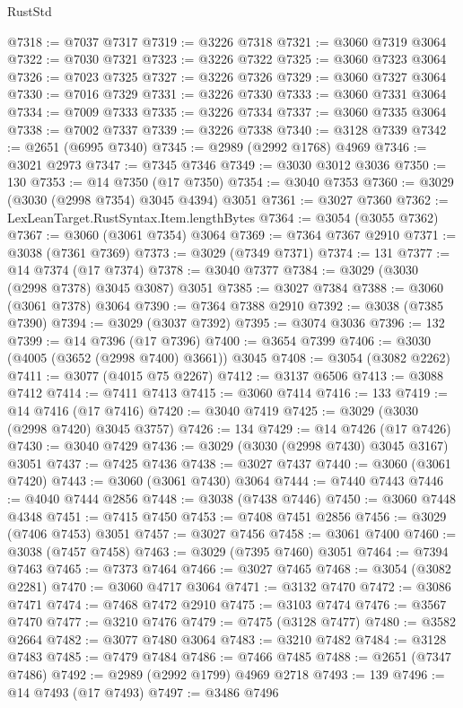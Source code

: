\begin{lexlean}{RustStd}
\begin{coremodule}
@7318 := @7037 @7317
@7319 := @3226 @7318
@7321 := @3060 @7319 @3064
@7322 := @7030 @7321
@7323 := @3226 @7322
@7325 := @3060 @7323 @3064
@7326 := @7023 @7325
@7327 := @3226 @7326
@7329 := @3060 @7327 @3064
@7330 := @7016 @7329
@7331 := @3226 @7330
@7333 := @3060 @7331 @3064
@7334 := @7009 @7333
@7335 := @3226 @7334
@7337 := @3060 @7335 @3064
@7338 := @7002 @7337
@7339 := @3226 @7338
@7340 := @3128 @7339
@7342 := @2651 (@6995 @7340)
@7345 := @2989 (@2992 @1768) @4969
@7346 := @3021 @2973
@7347 := @7345 @7346
@7349 := @3030 @3012 @3036
@7350 := 130
@7353 := @14 @7350 (@17 @7350)
@7354 := @3040 @7353
@7360 := @3029 (@3030 (@2998 @7354) @3045 @4394) @3051
@7361 := @3027 @7360
@7362 := LexLeanTarget.RustSyntax.Item.lengthBytes
@7364 := @3054 (@3055 @7362)
@7367 := @3060 (@3061 @7354) @3064
@7369 := @7364 @7367 @2910
@7371 := @3038 (@7361 @7369)
@7373 := @3029 (@7349 @7371)
@7374 := 131
@7377 := @14 @7374 (@17 @7374)
@7378 := @3040 @7377
@7384 := @3029 (@3030 (@2998 @7378) @3045 @3087) @3051
@7385 := @3027 @7384
@7388 := @3060 (@3061 @7378) @3064
@7390 := @7364 @7388 @2910
@7392 := @3038 (@7385 @7390)
@7394 := @3029 (@3037 @7392)
@7395 := @3074 @3036
@7396 := 132
@7399 := @14 @7396 (@17 @7396)
@7400 := @3654 @7399
@7406 := @3030 (@4005 (@3652 (@2998 @7400) @3661)) @3045
@7408 := @3054 (@3082 @2262)
@7411 := @3077 (@4015 @75 @2267)
@7412 := @3137 @6506
@7413 := @3088 @7412
@7414 := @7411 @7413
@7415 := @3060 @7414
@7416 := 133
@7419 := @14 @7416 (@17 @7416)
@7420 := @3040 @7419
@7425 := @3029 (@3030 (@2998 @7420) @3045 @3757)
@7426 := 134
@7429 := @14 @7426 (@17 @7426)
@7430 := @3040 @7429
@7436 := @3029 (@3030 (@2998 @7430) @3045 @3167) @3051
@7437 := @7425 @7436
@7438 := @3027 @7437
@7440 := @3060 (@3061 @7420)
@7443 := @3060 (@3061 @7430) @3064
@7444 := @7440 @7443
@7446 := @4040 @7444 @2856
@7448 := @3038 (@7438 @7446)
@7450 := @3060 @7448 @4348
@7451 := @7415 @7450
@7453 := @7408 @7451 @2856
@7456 := @3029 (@7406 @7453) @3051
@7457 := @3027 @7456
@7458 := @3061 @7400
@7460 := @3038 (@7457 @7458)
@7463 := @3029 (@7395 @7460) @3051
@7464 := @7394 @7463
@7465 := @7373 @7464
@7466 := @3027 @7465
@7468 := @3054 (@3082 @2281)
@7470 := @3060 @4717 @3064
@7471 := @3132 @7470
@7472 := @3086 @7471
@7474 := @7468 @7472 @2910
@7475 := @3103 @7474
@7476 := @3567 @7470
@7477 := @3210 @7476
@7479 := @7475 (@3128 @7477)
@7480 := @3582 @2664
@7482 := @3077 @7480 @3064
@7483 := @3210 @7482
@7484 := @3128 @7483
@7485 := @7479 @7484
@7486 := @7466 @7485
@7488 := @2651 (@7347 @7486)
@7492 := @2989 (@2992 @1799) @4969 @2718
@7493 := 139
@7496 := @14 @7493 (@17 @7493)
@7497 := @3486 @7496

\end{coremodule}
\end{lexlean}
